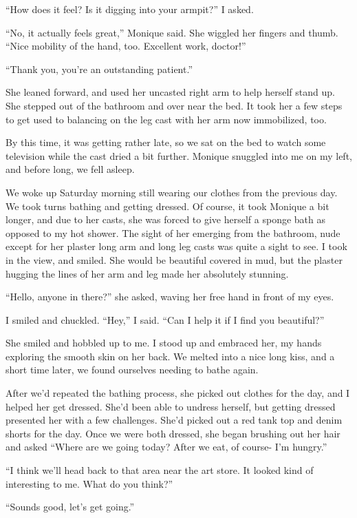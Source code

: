 ``How does it feel? Is it digging into your armpit?'' I asked.

``No, it actually feels great,'' Monique said. She wiggled her fingers and thumb. ``Nice
mobility of the hand, too. Excellent work, doctor!''

``Thank you, you're an outstanding patient.''

She leaned forward, and used her uncasted right arm to help herself stand up. She stepped
out of the bathroom and over near the bed. It took her a few steps to get used to balancing on
the leg cast with her arm now immobilized, too.

By this time, it was getting rather late, so we sat on the bed to watch some television
while the cast dried a bit further. Monique snuggled into me on my left, and before long, we
fell asleep.

We woke up Saturday morning still wearing our clothes from the previous day. We took turns
bathing and getting dressed. Of course, it took Monique a bit longer, and due to her casts, she
was forced to give herself a sponge bath as opposed to my hot shower. The sight of her emerging
from the bathroom, nude except for her plaster long arm and long leg casts was quite a sight to
see. I took in the view, and smiled. She would be beautiful covered in mud, but the plaster
hugging the lines of her arm and leg made her absolutely stunning.

``Hello, anyone in there?'' she asked, waving her free hand in front of my eyes.

I smiled and chuckled. ``Hey,'' I said. ``Can I help it if I find you beautiful?''

She smiled and hobbled up to me. I stood up and embraced her, my hands exploring the smooth
skin on her back. We melted into a nice long kiss, and a short time later, we found ourselves
needing to bathe again.

After we'd repeated the bathing process, she picked out clothes for the day, and I helped
her get dressed. She'd been able to undress herself, but getting dressed presented her with a
few challenges. She'd picked out a red tank top and denim shorts for the day. Once we were both
dressed, she began brushing out her hair and asked ``Where are we going today? After we eat, of
course- I'm hungry.''

``I think we'll head back to that area near the art store. It looked kind of interesting to
me. What do you think?''

``Sounds good, let's get going.''

